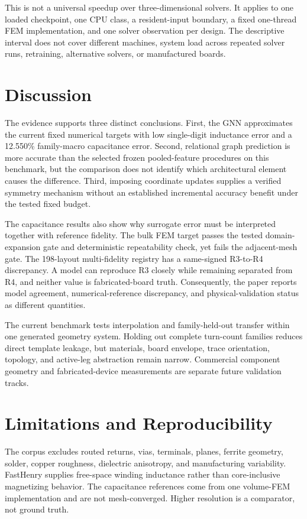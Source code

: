 \documentclass[journal]{IEEEtran}
\begin{document}
This is not a universal speedup over three-dimensional solvers. It applies to one loaded checkpoint, one CPU class, a resident-input boundary, a fixed one-thread FEM implementation, and one solver observation per design. The descriptive interval does not cover different machines, system load across repeated solver runs, retraining, alternative solvers, or manufactured boards.

\section{Discussion}
The evidence supports three distinct conclusions. First, the GNN approximates the current fixed numerical targets with low single-digit inductance error and a 12.550\% family-macro capacitance error. Second, relational graph prediction is more accurate than the selected frozen pooled-feature procedures on this benchmark, but the comparison does not identify which architectural element causes the difference. Third, imposing coordinate updates supplies a verified symmetry mechanism without an established incremental accuracy benefit under the tested fixed budget.

The capacitance results also show why surrogate error must be interpreted together with reference fidelity. The bulk FEM target passes the tested domain-expansion gate and deterministic repeatability check, yet fails the adjacent-mesh gate. The 198-layout multi-fidelity registry has a same-signed R3-to-R4 discrepancy. A model can reproduce R3 closely while remaining separated from R4, and neither value is fabricated-board truth. Consequently, the paper reports model agreement, numerical-reference discrepancy, and physical-validation status as different quantities.

The current benchmark tests interpolation and family-held-out transfer within one generated geometry system. Holding out complete turn-count families reduces direct template leakage, but materials, board envelope, trace orientation, topology, and active-leg abstraction remain narrow. Commercial component geometry and fabricated-device measurements are separate future validation tracks.

\section{Limitations and Reproducibility}
The corpus excludes routed returns, vias, terminals, planes, ferrite geometry, solder, copper roughness, dielectric anisotropy, and manufacturing variability. FastHenry supplies free-space winding inductance rather than core-inclusive magnetizing behavior. The capacitance references come from one volume-FEM implementation and are not mesh-converged. Higher resolution is a comparator, not ground truth.
\end{document}
